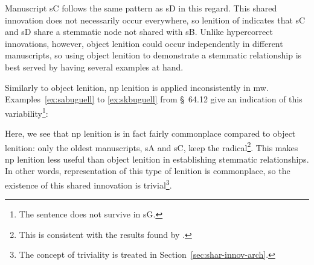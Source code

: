 Manuscript \gls{sC} follows the same pattern as \gls{sD} in this regard. This shared innovation does not necessarily occur everywhere, so lenition of  indicates that  \gls{sC} and \gls{sD} share a stemmatic node not shared with \gls{sB}. Unlike hypercorrect innovations, however, object lenition could occur independently in different manuscripts, so using object lenition to demonstrate a stemmatic relationship is best served by having several examples at hand.


Similarly to object lenition, \gls{np} lenition is applied inconsistently in \gls{mw}. Examples~\ref{ex:sabuguell} to \ref{ex:skbuguell} from  §~64.12 give an indication of this variability\footnote{The sentence does not survive in \gls{sG}.}:
\begin{mwl}
\end{mwl}
Here, we see that \gls{np} lenition is in fact fairly commonplace compared to object lenition: only the oldest manuscripts, \gls{sA} and \gls{sC}, keep the radical\footnote{This is consistent with the results found by \textcite{van_development14}.}. This makes \gls{np} lenition less useful than object lenition in establishing stemmatic relationships. In other words, representation of this type of lenition is commonplace, so the existence of this shared innovation is trivial\footnote{The concept of triviality is treated in Section~\ref{sec:shar-innov-arch}.}.

